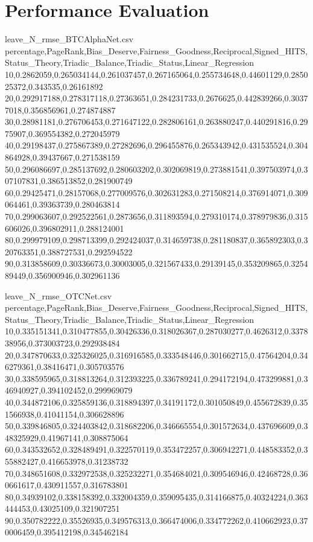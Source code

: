
\section{Performance Evaluation}

\begin{filecontents*}{leave_N_rmse_BTCAlphaNet.csv}
percentage,PageRank,Bias_Deserve,Fairness_Goodness,Reciprocal,Signed_HITS,Status_Theory,Triadic_Balance,Triadic_Status,Linear_Regression
10,0.2862059,0.265034144,0.261037457,0.267165064,0.255734648,0.44601129,0.285025372,0.343535,0.26161892
20,0.292917188,0.278317118,0.27363651,0.284231733,0.2676625,0.442839266,0.30377018,0.356856961,0.274874887
30,0.28981181,0.276706453,0.271647122,0.282806161,0.263880247,0.440291816,0.2975907,0.369554382,0.272045979
40,0.29198437,0.275867389,0.27282696,0.296455876,0.265343942,0.431535524,0.304864928,0.39437667,0.271538159
50,0.296086697,0.285137692,0.280603202,0.302069819,0.273881541,0.397503974,0.307107831,0.386513852,0.281900749
60,0.29425471,0.28157068,0.277009576,0.302631283,0.271508214,0.376914071,0.309064461,0.39363739,0.280463814
70,0.299063607,0.292522561,0.2873656,0.311893594,0.279310174,0.378979836,0.315606026,0.396802911,0.288124001
80,0.299979109,0.298713399,0.292424037,0.314659738,0.281180837,0.365892303,0.320763351,0.388727531,0.292594522
90,0.313858609,0.30336673,0.30003005,0.321567433,0.29139145,0.353209865,0.325489449,0.356900946,0.302961136
\end{filecontents*}

\begin{filecontents*}{leave_N_rmse_OTCNet.csv}
percentage,PageRank,Bias_Deserve,Fairness_Goodness,Reciprocal,Signed_HITS,Status_Theory,Triadic_Balance,Triadic_Status,Linear_Regression
10,0.335151341,0.310477855,0.30426336,0.318026367,0.287030277,0.4626312,0.337838956,0.373003723,0.292938484
20,0.347870633,0.325326025,0.316916585,0.333548446,0.301662715,0.47564204,0.346279361,0.38416471,0.305703576
30,0.338595965,0.318813264,0.312393225,0.336789241,0.294172194,0.473299881,0.346940927,0.394102452,0.299969079
40,0.344872106,0.325859136,0.318894397,0.34191172,0.301050849,0.455672839,0.351566938,0.41041154,0.306628896
50,0.339846805,0.324403842,0.318682206,0.346665554,0.301572634,0.437696609,0.348325929,0.41967141,0.308875064
60,0.343532652,0.328489491,0.322570119,0.353472257,0.306942271,0.448583352,0.355882427,0.416653978,0.31238732
70,0.348651608,0.332972538,0.325232271,0.354684021,0.309546946,0.42468728,0.360661617,0.430911557,0.316783801
80,0.34939102,0.338158392,0.332004359,0.359095435,0.314166875,0.40324224,0.363444453,0.43025109,0.321907251
90,0.350782222,0.35526935,0.349576313,0.366474006,0.334772262,0.410662923,0.370006459,0.395412198,0.345462184
\end{filecontents*}

